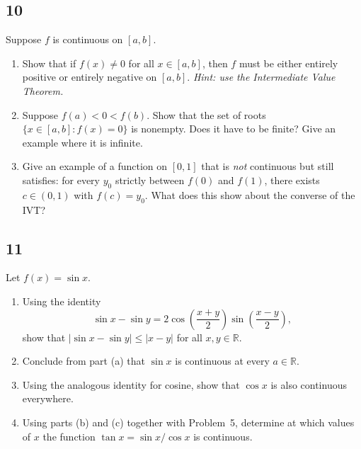 \documentclass[11pt,oneside,reqno]{amsbook}
\newcommand\R{{\mathbb R}}
\numberwithin{equation}{section}
\theoremstyle{definition}
\theoremstyle{remark}
\begin{document}
\subsection*{10} Suppose $f$ is continuous on $[a,b]$.
\begin{enumerate}[label=(\alph*)]
    \item Show that if $f(x) \neq 0$ for all $x \in [a,b]$, then $f$ must be either entirely positive or entirely negative on $[a,b]$. \textit{Hint: use the Intermediate Value Theorem.}
    \item Suppose $f(a) < 0 < f(b)$. Show that the set of roots $\{x \in [a,b] : f(x) = 0\}$ is nonempty. Does it have to be finite? Give an example where it is infinite.
    \item Give an example of a function on $[0,1]$ that is \textit{not} continuous but still satisfies: for every $y_0$ strictly between $f(0)$ and $f(1)$, there exists $c \in (0,1)$ with $f(c) = y_0$. What does this show about the converse of the IVT?
\end{enumerate}

\subsection*{11} Let $f(x) = \sin x$.
\begin{enumerate}[label=(\alph*)]
    \item Using the identity
    \[
    \sin x - \sin y = 2\cos\!\left(\frac{x+y}{2}\right)\sin\!\left(\frac{x-y}{2}\right),
    \]
    show that $|\sin x - \sin y| \leq |x - y|$ for all $x, y \in \R$.
    \item Conclude from part (a) that $\sin x$ is continuous at every $a \in \R$.
    \item Using the analogous identity for cosine, show that $\cos x$ is also continuous everywhere.
    \item Using parts (b) and (c) together with Problem~5, determine at which values of $x$ the function $\tan x = \sin x / \cos x$ is continuous.
\end{enumerate}
\end{document}
